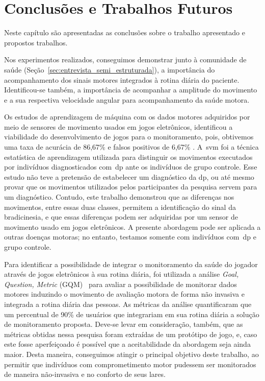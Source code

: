 \chapter{Conclusões e Trabalhos Futuros}\label{chapter:conclusoes_futuros}
Neste capítulo são apresentadas as conclusões sobre o trabalho apresentado e propostos trabalhos.  


Nos experimentos realizados, conseguimos demonstrar junto à comunidade de saúde (Seção~\ref{sec:entrevista_semi_estruturada}), a importância do acompanhamento dos sinais motores integrados à rotina diária do paciente. Identificou-se também, a importância de acompanhar a amplitude do movimento e a sua respectiva velocidade angular para acompanhamento da saúde motora.

Os estudos de aprendizagem de máquina com os dados motores adquiridos por meio de sensores de movimento usados em jogos eletrônicos, identificou a viabilidade do desenvolvimento de jogos para o monitoramento, pois, obtivemos uma taxa de acurácia de 86,67\% e falsos positivos de 6,67\% . A~\ac{svm} foi a técnica estatística de aprendizagem utilizada para distinguir os movimentos executados por indivíduos diagnosticados com~\ac{dp} ante os indivíduos de grupo controle. Esse estudo não teve a pretensão de estabelecer um diagnóstico da \ac{dp}, ou até mesmo provar que os movimentos utilizados pelos participantes da pesquisa servem para um diagnóstico. Contudo, este trabalho demonstrou que as diferenças nos movimentos, entre essas duas classes, permitem a identificação do sinal da bradicinesia, e que essas diferenças podem ser adquiridas por um sensor de movimento usado em jogos eletrônicos. A presente abordagem pode ser aplicada a outras doenças motoras; no entanto, testamos somente com indivíduos com~\ac{dp} e grupo controle.

Para identificar a possibilidade de integrar o monitoramento da saúde do jogador através de jogos eletrônicos à sua rotina diária, foi utilizada a análise \textit{Goal, Question, Metric} (GQM)~\cite{basili94} para avaliar a possibilidade de monitorar dados motores induzindo o movimento de avaliação motora de forma não invasiva e integrada a rotina diária das pessoas. As métricas da análise quantificaram que um percentual de 90\% de usuários que integrariam em sua rotina diária a solução de monitoramento proposta. Deve-se levar em consideração, também, que as métricas obtidas nessa pesquisa foram extraídas de um protótipo de jogo, e, caso este fosse aperfeiçoado é possível que a aceitabilidade da abordagem seja ainda maior. Desta maneira, conseguimos atingir o principal objetivo deste trabalho, ao permitir que indivíduos com comprometimento motor pudessem ser monitorados de maneira não-invasiva e no conforto de seus lares.

